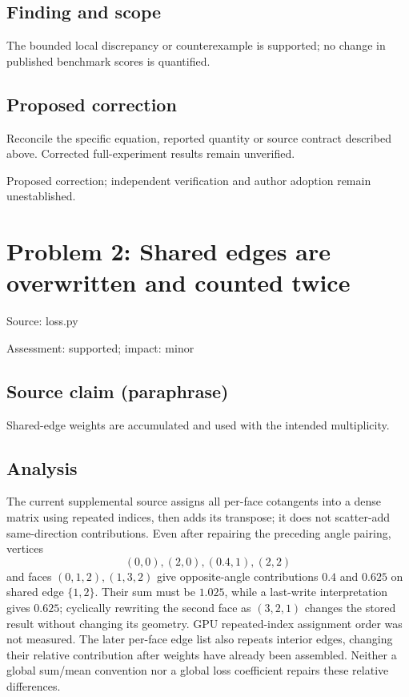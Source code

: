 \documentclass[11pt]{article}
\begin{document}
\subsection*{Finding and scope}

The bounded local discrepancy or counterexample is supported; no change in published benchmark scores is quantified.

\subsection*{Proposed correction}

Reconcile the specific equation, reported quantity or source contract described above. Corrected full-experiment results remain unverified.

Proposed correction; independent verification and author adoption remain unestablished.

\section*{Problem 2: Shared edges are overwritten and counted twice}

Source: loss.py

Assessment: supported; impact: minor

\subsection*{Source claim (paraphrase)}

Shared-edge weights are accumulated and used with the intended multiplicity.

\subsection*{Analysis}

The current supplemental source assigns all per-face cotangents into a dense matrix using repeated indices, then adds its transpose; it does not scatter-add same-direction contributions. Even after repairing the preceding angle pairing, vertices \[(0,0),(2,0),(0.4,1),(2,2)\] and faces \((0,1,2),(1,3,2)\) give opposite-angle contributions \(0.4\) and \(0.625\) on shared edge \(\{1,2\}\). Their sum must be \(1.025\), while a last-write interpretation gives \(0.625\); cyclically rewriting the second face as \((3,2,1)\) changes the stored result without changing its geometry. GPU repeated-index assignment order was not measured. The later per-face edge list also repeats interior edges, changing their relative contribution after weights have already been assembled. Neither a global sum/mean convention nor a global loss coefficient repairs these relative differences.
\end{document}
